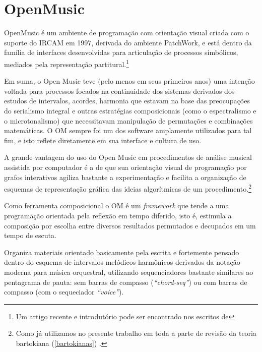 \documentclass[
	12pt,				%
	openright,			%
	twoside,			%
	a4paper,			%
	english,			%
	french,				%
	spanish,			%
	brazil				%
	]{abntex2}
\begin{document}



\pagebreak
\section{OpenMusic}

OpenMusic é um ambiente de programação com orientação visual criada com o suporte do IRCAM em 1997, derivada do ambiente PatchWork, e está dentro da família de interfaces desenvolvidas para articulação de processos simbólicos, mediados pela representação partitural.\footnote{Um artigo recente e introdutório pode ser encontrado nos escritos de }

Em suma, o Open Music teve (pelo menos em seus primeiros anos) uma intenção voltada para processos focados na continuidade dos sistemas derivados dos estudos de intervalos, acordes, harmonia que estavam na base das preocupações do serialismo integral e outras estratégias composicionais (como o espectralismo e o microtonalismo) que necessitavam manipulação de permutações e combinações matemáticas. O OM sempre foi um dos software amplamente utilizados para tal fim, e isto reflete diretamente em sua interface e cultura de uso.

A grande vantagem do uso do Open Music em procedimentos de análise musical assistida por computador é a de que sua orientação visual de programação por grafos interativos agiliza bastante a experimentação e facilita a organização de esquemas de representação gráfica das ideias algorítmicas de um procedimento.\footnote{Como já utilizamos no presente trabalho em toda a parte de revisão da teoria bartokiana (\autoref{bartokianas})  .} 

Como ferramenta composicional o OM é um \textit{framework} que tende a uma programação orientada pela reflexão em tempo diferido, isto é, estimula a composição por escolha entre diversos resultados permutados e decupados em um tempo de escuta.

Organiza materiais orientado basicamente pela escrita e fortemente pensado dentro do esquema de intervalos melódicos harmônicos derivados da notação moderna para música orquestral, utilizando sequenciadores bastante similares ao pentagrama de pauta: sem barras de compasso (\textit{“chord-seq”}) ou com barras de compasso (com o sequeciador \textit{“voice”}).
\end{document}
